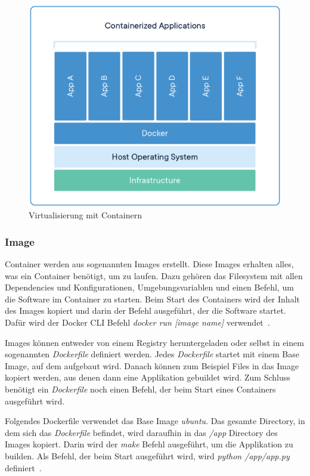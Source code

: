  \begin{figure}[hbt!]
     \centering
     \includegraphics[scale=0.2]{pics/docker-containerized}
     \caption{Virtualisierung mit Containern~\cite{docker-container}}
 \end{figure}

\subsubsection{Image}
 Container werden aus sogenannten Images erstellt.
 Diese Images erhalten alles, was ein Container benötigt, um zu laufen.
 Dazu gehören das Filesystem mit allen Dependencies und Konfigurationen, Umgebungsvariablen
 und einen Befehl, um die Software im Container zu starten.
 Beim Start des Containers wird der Inhalt des Images kopiert und darin der Befehl ausgeführt, der die Software
 startet.
 Dafür wird der Docker CLI Befehl \textit{docker run [image name]} verwendet~\cite{docker-image}.

 Images können entweder von einem Registry heruntergeladen oder selbst in einem sogenannten \textit{Dockerfile}
 definiert werden.
 Jedes \textit{Dockerfile} startet mit einem Base Image, auf dem aufgebaut wird.
 Danach können zum Beispiel Files in das Image kopiert werden, aus denen dann eine Applikation gebuildet wird.
 Zum Schluss benötigt ein \textit{Dockerfile} noch einen Befehl, der beim Start eines Containers ausgeführt wird.

 Folgendes Dockerfile verwendet das Base Image \textit{ubuntu}.
 Das gesamte Directory, in dem sich das \textit{Dockerfile} befindet, wird daraufhin in das \textit{/app} Directory
 des Images kopiert.
 Darin wird der \textit{make} Befehl ausgeführt, um die Applikation zu builden.
 Als Befehl, der beim Start ausgeführt wird, wird \textit{python /app/app.py} definiert~\cite{dockerfile}.

